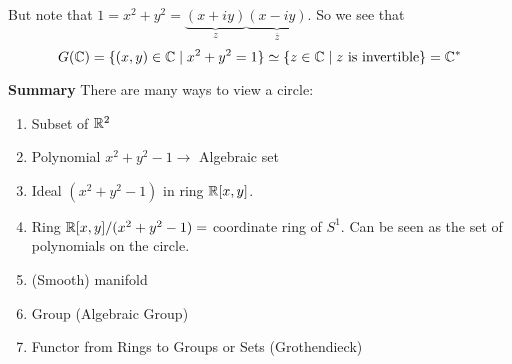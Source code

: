 But note that $1 = x^2+y^2 = {\underbrace{(x+iy)}_z}{\underbrace{(x-iy)}_{\overline{z}}}$. So we see that \begin{equation}
    G(\mathbb{C}) = \{(x,y)\in\mathbb{C} \mid x^2+y^2 = 1\}\simeq \{z\in \mathbb{C} \mid z\text{ is invertible}\} = \mathbb{C}^\ast
\end{equation}

\textbf{Summary}
There are many ways to view a circle:\begin{enumerate}
    \item Subset of $\mathbb{R}^2$
    \item Polynomial $x^2+y^2-1 \rightarrow$   Algebraic set
    \item Ideal $(x^2+y^2-1)$ in ring $\mathbb{R}[x,y]$.
    \item Ring $\mathbb{R}[x,y]/(x^2+y^2-1) = $ coordinate ring of $S^1$. Can be seen as the set of polynomials on the circle.
    \item (Smooth) manifold
    \item Group (Algebraic Group)
    \item Functor from Rings to Groups or Sets (Grothendieck)
\end{enumerate}

